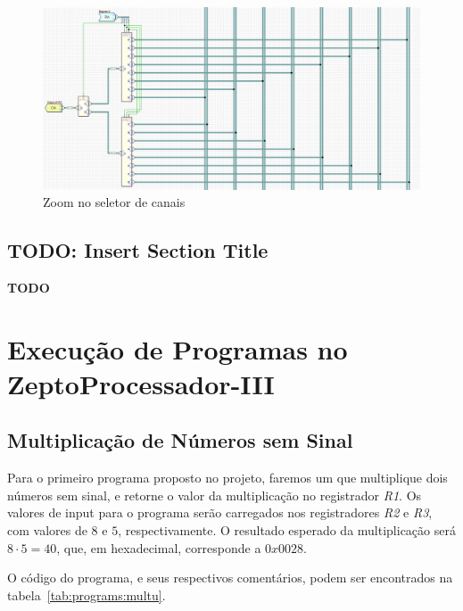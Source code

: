 \documentclass[12pt]{article}
\begin{document}
\begin{figure}[H]
    \centering
    \includegraphics[width=.9\textwidth]{Projeto/images/circuit__register_file_2.png}
    \caption{Zoom no seletor de canais}\label{fig:circuit__register_file_2.png}
\end{figure}


\subsection{\textbf{TODO: Insert Section Title}}\label{sec:2.4}

\textbf{TODO}

\section{Execução de Programas no ZeptoProcessador-III}\label{sec:programs}

\subsection{Multiplicação de Números sem Sinal}\label{sec:programs:multu}

Para o primeiro programa proposto no projeto, faremos um que multiplique dois
números sem sinal, e retorne o valor da multiplicação no registrador \emph{R1}.
Os valores de input para o programa serão carregados nos registradores \emph{R2}
e \emph{R3}, com valores de $8$ e $5$, respectivamente. O resultado esperado da
multiplicação será $8 \cdot 5 = 40$, que, em hexadecimal, corresponde a
$0x0028$.

O código do programa, e seus respectivos comentários, podem ser encontrados na
tabela~\ref{tab:programs:multu}.
\end{document}
